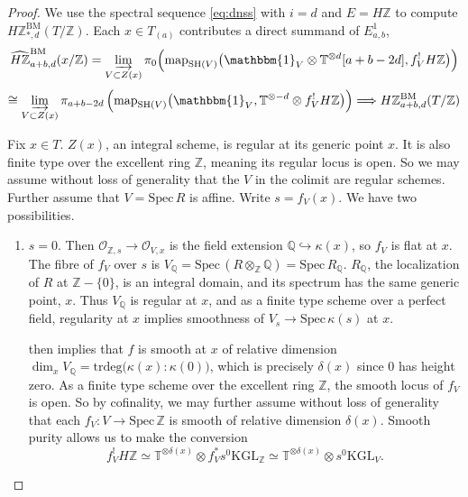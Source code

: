 \documentclass[11pt, twoside]{article}
\numberwithin{equation}{section}
\theoremstyle{definition}
\newcommand{\bb}[1]{\mathbb{#1}}
\newcommand{\colim}{\varinjlim}
\newcommand{\spec}{\mathrm{Spec} \,}
\newcommand{\trd}{\mathrm{trdeg}}
\newcommand{\map}{\mathrm{map}}
\newcommand{\Kgl}{\mathrm{KGL}}
\newcommand{\sh}{\mathrm{SH}}
\newcommand{\bm}{\mathrm{BM}}
\begin{document}
\begin{proof}
We use the spectral sequence \eqref{eq:dnss} with \(i = d\) and \(E = H\bb{Z}\) to compute \(H\bb{Z}_{*, d}^\bm(T/\bb{Z})\). Each \(x \in T_{(a)}\) contributes a direct summand of \(E_{a, b}^1\),  
\[\hat{H\bb{Z}}_{a + b, d}^\bm(x/\bb{Z}) = \colim_{V \subset Z(x)} \pi_0 \! \left(\map_{\sh(V)}\big(\mathbbm{1}_V \otimes \bb{T}^{\otimes d}[a + b - 2d], f_V^! H\bb{Z}\big)\right)\]
\[\cong \colim_{V \subset Z(x)} \pi_{a + b - 2d}\left(\map_{\sh(V)}\big(\mathbbm{1}_V, \bb{T}^{\otimes - d} \otimes f_V^! H\bb{Z}\big)\right) \Longrightarrow H\bb{Z}_{a + b, d}^\bm(T/\bb{Z})\]

Fix \(x \in T\). \(Z(x)\), an integral scheme, is regular at its generic point \(x\). It is also finite type over the excellent ring \(\bb{Z}\), meaning its regular locus is open. So we may assume without loss of generality that the \(V\) in the colimit are regular schemes. Further assume that \(V = \spec R\) is affine. Write \(s = f_V(x)\). We have two possibilities. 
\begin{enumerate}
\item \(s = 0\). Then \(\mathcal{O}_{\bb{Z}, s} \to \mathcal{O}_{V, x}\) is the field extension \(\bb{Q} \hookrightarrow \kappa(x)\), so \(f_V\) is flat at \(x\). The fibre of \(f_V\) over \(s\) is \(V_\bb{Q} = \spec (R \otimes_\bb{Z} \bb{Q}) = \spec R_\bb{Q}\). \(R_\bb{Q}\), the localization of \(R\) at \(\bb{Z} - \{0\}\), is an integral domain, and its spectrum has the same generic point, \(x\). Thus \(V_\bb{Q}\) is regular at \(x\), and as a finite type scheme over a perfect field, regularity at \(x\) implies smoothness of \(V_s \to \spec \kappa(s)\) at \(x\).

\cite[Tag 01V9]{Sta} then implies that \(f\) is smooth at \(x\) of relative dimension \(\dim_x V_\bb{Q} = \trd\big(\kappa(x) : \kappa(0)\big)\), which is precisely \(\delta(x)\) since \(0\) has height zero. As a finite type scheme over the excellent ring \(\bb{Z}\), the smooth locus of \(f_V\) is open. So by cofinality, we may further assume without loss of generality that each \(f_V \colon V \to \spec \bb{Z}\) is smooth of relative dimension \(\delta(x)\). Smooth purity allows us to make the conversion 
\[f_V^!H\bb{Z} \simeq \bb{T}^{\otimes \delta(x)} \otimes f_V^* s^0 \Kgl_\bb{Z} \simeq \bb{T}^{\otimes \delta(x)} \otimes s^0 \Kgl_V.\]


\end{enumerate}
\end{proof}
\end{document}
